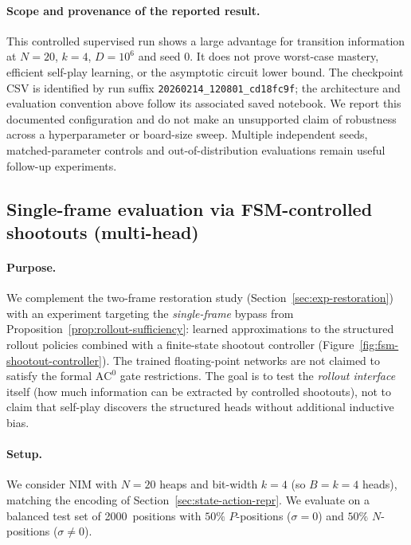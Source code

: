 \documentclass[11pt]{article}
\newcommand{\AC}{\mathrm{AC}}
\theoremstyle{plain}
\theoremstyle{definition}
\theoremstyle{remark}
\numberwithin{equation}{section}
\begin{document}
\paragraph{Scope and provenance of the reported result.}
This controlled supervised run shows a large advantage for transition information at $N=20$, $k=4$, $D=10^6$ and seed 0. It does not prove worst-case mastery, efficient self-play learning, or the asymptotic circuit lower bound. The checkpoint CSV is identified by run suffix \texttt{20260214\_120801\_cd18fc9f}; the architecture and evaluation convention above follow its associated saved notebook.
We report this documented configuration and do not make an unsupported claim of robustness across a hyperparameter or board-size sweep. Multiple independent seeds, matched-parameter controls and out-of-distribution evaluations remain useful follow-up experiments.

\subsection{Single-frame evaluation via FSM-controlled shootouts (multi-head)}
\label{sec:exp-fsm-shootout}

\paragraph{Purpose.}
We complement the two-frame restoration study (Section~\ref{sec:exp-restoration}) with an experiment targeting the \emph{single-frame} bypass from Proposition~\ref{prop:rollout-sufficiency}:
learned approximations to the structured rollout policies combined with a finite-state shootout controller (Figure~\ref{fig:fsm-shootout-controller}). The trained floating-point networks are not claimed to satisfy the formal $\AC^0$ gate restrictions.
The goal is to test the \emph{rollout interface} itself (how much information can be extracted by controlled shootouts), not to claim that self-play discovers the structured heads without additional inductive bias.

\paragraph{Setup.}
We consider NIM with $N=20$ heaps and bit-width $k=4$ (so $B=k=4$ heads), matching the encoding of Section~\ref{sec:state-action-repr}.
We evaluate on a balanced test set of 2000~positions with $50\%$ $P$-positions ($\sigma=0$) and $50\%$ $N$-positions ($\sigma\neq 0$).
\end{document}
